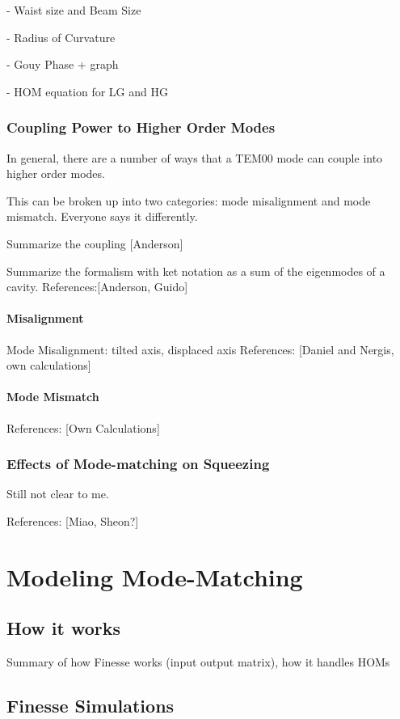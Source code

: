 \documentclass[10pt,a4paper]{book}
\begin{document}
		- Waist size and Beam Size
		
		- Radius of Curvature
		
		- Gouy Phase + graph
		
		- HOM equation for LG and HG
		
		\subsection{Coupling Power to Higher Order Modes}
		
		In general, there are a number of ways that a TEM00 mode can couple into higher order modes.  
		
		This can be broken up into two categories: mode misalignment and mode mismatch.  Everyone says it differently.
		
		Summarize the coupling [Anderson]
		
		Summarize the formalism with ket notation as a sum of the eigenmodes of a cavity.
		References:[Anderson, Guido]
		
		
		\subsubsection{Misalignment}
		
		
		Mode Misalignment: tilted axis, displaced axis
		References: [Daniel and Nergis, own calculations]
		
		\subsubsection{Mode Mismatch}
		References: [Own Calculations]
	
		\subsection{Effects of Mode-matching on Squeezing}
		Still not clear to me.
	
		References: [Miao, Sheon?]
	
	
\chapter{Modeling Mode-Matching}	
	\section{How it works}
	Summary of how Finesse works (input output matrix), how it handles HOMs

	\section{Finesse Simulations}
\end{document}
